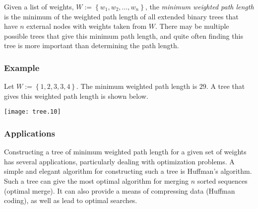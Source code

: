 \documentclass[12pt]{article}
\begin{document}
Given a list of weights, $W := \left\{ w_1, w_2, \dots, w_n \right\}$, the
\emph{minimum weighted path length} is the minimum of the weighted path length of all extended binary trees that have $n$ external nodes with weights taken from $W$.  There may be multiple possible trees that give this minimum path length, and quite often finding this tree is more important than determining the path length.

\subsubsection*{Example}

Let $W := \left\{ 1, 2, 3, 3, 4 \right\}$.  The minimum weighted path length is
$29$.  A tree that gives this weighted path length is shown below.

\begin{center}
\texttt{[image: tree.10]}
\end{center}

\subsubsection*{Applications}

Constructing a tree of minimum weighted path length for a given set of weights has several applications, particularly dealing with optimization problems.
A simple and elegant algorithm for constructing such a tree is Huffman's algorithm.
Such a tree can give the most optimal algorithm for merging $n$ sorted sequences (optimal merge).  It can also provide a means of compressing data (Huffman coding), as well as lead to optimal searches.
\end{document}
